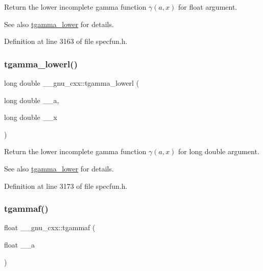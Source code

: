 Return the lower incomplete gamma function $ \gamma(a,x) $ for {\ttfamily float} argument.

\begin{DoxySeeAlso}{See also}
\hyperlink{group__gnu__math__spec__func_gaed107908dec8865ea48e7764f7ea88a2}{tgamma\+\_\+lower} for details. 
\end{DoxySeeAlso}


Definition at line 3163 of file specfun.\+h.

\mbox{\label{group__gnu__math__spec__func_gad057fe49a5bf95b1550f5f0a6e60bb19}} 
\subsubsection{\texorpdfstring{tgamma\+\_\+lowerl()}{tgamma\_lowerl()}}
{\footnotesize\ttfamily long double \+\_\+\+\_\+gnu\+\_\+cxx\+::tgamma\+\_\+lowerl (\begin{DoxyParamCaption}\item[{long double}]{\+\_\+\+\_\+a,  }\item[{long double}]{\+\_\+\+\_\+x }\end{DoxyParamCaption})\hspace{0.3cm}{\ttfamily [inline]}}

Return the lower incomplete gamma function $ \gamma(a,x) $ for {\ttfamily long double} argument.

\begin{DoxySeeAlso}{See also}
\hyperlink{group__gnu__math__spec__func_gaed107908dec8865ea48e7764f7ea88a2}{tgamma\+\_\+lower} for details. 
\end{DoxySeeAlso}


Definition at line 3173 of file specfun.\+h.

\mbox{\label{group__gnu__math__spec__func_ga008b1f4cc3a54c9c8221ad1f3504b593}} 
\subsubsection{\texorpdfstring{tgammaf()}{tgammaf()}\hspace{0.1cm}{\footnotesize\ttfamily [1/3]}}
{\footnotesize\ttfamily float \+\_\+\+\_\+gnu\+\_\+cxx\+::tgammaf (\begin{DoxyParamCaption}\item[{float}]{\+\_\+\+\_\+a }\end{DoxyParamCaption})\hspace{0.3cm}{\ttfamily [inline]}}

